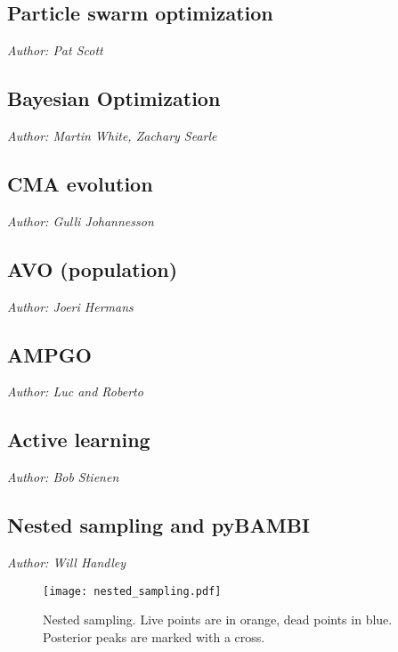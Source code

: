 \documentclass[11pt]{article}
\begin{document}
\subsection{Particle swarm optimization}
\emph{Author: Pat Scott}

\subsection{Bayesian Optimization}

\emph{Author: Martin White, Zachary Searle}

\subsection{CMA evolution}
\emph{Author: Gulli Johannesson}

\subsection{AVO (population)}
\emph{Author: Joeri Hermans}

\subsection{AMPGO}
\emph{Author: Luc and Roberto} 

\subsection{Active learning}
\emph{Author: Bob Stienen}

\subsection{Nested sampling and pyBAMBI}

\emph{Author: Will Handley}
\begin{figure}
    \centerline{%
        \texttt{[image: nested\_sampling.pdf]}
    }
    \caption{Nested sampling. Live points are in orange, dead points in blue. Posterior peaks are marked with a cross.\label{fig:nested_sampling}}
\end{figure}
\end{document}

